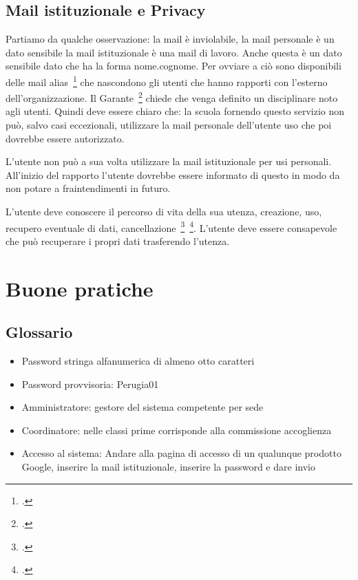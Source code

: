 \documentclass[structure=book,  
pagelayout=standard,defaultfont=cochineal,partialtoc]{suftesi}
\begin{document}
\section{Mail istituzionale e Privacy}
Partiamo da qualche osservazione: la mail è inviolabile,  la mail personale è 
un dato sensibile la 
mail istituzionale è una mail di lavoro.  Anche questa è un dato sensibile  
dato che ha la forma nome.cognome. Per ovviare a ciò sono  
disponibili delle mail alias~\footcite{Garante2007} che nascondono gli utenti 
che  hanno rapporti 
con l'esterno dell'organizzazione. Il Garante~\footcite{Garante2007} chiede che 
venga definito un disciplinare noto agli utenti. Quindi deve essere chiaro che:
la scuola fornendo questo servizio non può, salvo casi eccezionali, utilizzare 
la mail personale dell'utente uso che poi dovrebbe essere autorizzato. 

L'utente non può a sua volta utilizzare la mail istituzionale per  usi  
personali. All'inizio del rapporto l'utente dovrebbe essere informato di questo 
in modo da non potare a fraintendimenti in futuro.

L'utente deve conoscere il percorso di vita della sua utenza, creazione, uso, 
recupero eventuale di dati, 
cancellazione~\footcite{Garante2007}~\footcite{Garante2019}. L'utente deve 
essere consapevole che 
può recuperare i propri dati trasferendo l'utenza. 
\chapter{Buone pratiche}
\printpartialtoc
\section{Glossario}
\begin{itemize}
	\item Password stringa alfanumerica di almeno otto caratteri
	\item Password provvisoria: Perugia01
	\item Amministratore: gestore del sistema competente per sede
	\item Coordinatore: nelle classi prime corrisponde alla commissione 
	accoglienza
	\item Accesso al sistema: Andare alla pagina di accesso di un qualunque 
	prodotto Google, inserire la mail istituzionale, inserire la password e 
	dare invio
\end{itemize}
\end{document}
